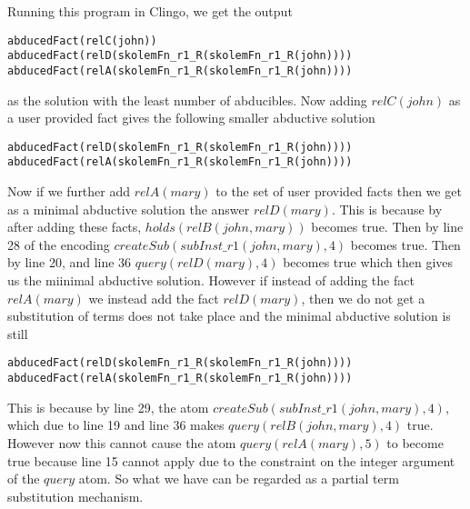 \documentclass{article}
\begin{document}
Running this program in Clingo, we get the output 
\begin{verbatim}
abducedFact(relC(john))
abducedFact(relD(skolemFn_r1_R(skolemFn_r1_R(john))))
abducedFact(relA(skolemFn_r1_R(skolemFn_r1_R(john))))    
\end{verbatim}
as the solution with the least number of abducibles.
Now adding $relC(john)$ as a user provided fact gives the following smaller abductive solution
\begin{verbatim}
abducedFact(relD(skolemFn_r1_R(skolemFn_r1_R(john))))
abducedFact(relA(skolemFn_r1_R(skolemFn_r1_R(john))))    
\end{verbatim}
Now if we further add $relA(mary)$ to the set of user provided facts then we get as a minimal abductive solution the answer $relD(mary)$. This is because by after adding these facts, $holds(relB(john,mary))$ becomes true. Then by line 28 of the encoding   $createSub(subInst\_r1(john,mary),4)$ becomes true. Then by line 20, and line 36 $query(relD(mary),4)$ becomes true which then gives us the miinimal abductive solution. However if instead of adding the fact $relA(mary)$ we instead add the fact $relD(mary)$, then we do not get a  substitution of terms does not take place and the minimal abductive solution is still \begin{verbatim}
abducedFact(relD(skolemFn_r1_R(skolemFn_r1_R(john))))
abducedFact(relA(skolemFn_r1_R(skolemFn_r1_R(john))))    
\end{verbatim} This is because by line 29, the atom $createSub(subInst\_r1(john,mary),4)$, which due to line 19 and line 36 makes $query(relB(john,mary),4)$ true. However now this cannot cause the atom $query(relA(mary),5)$ to become true because line 15 cannot apply due to the constraint on the integer argument of the $query$ atom. So what we have can be regarded as a partial term substitution mechanism.  
\end{document}
